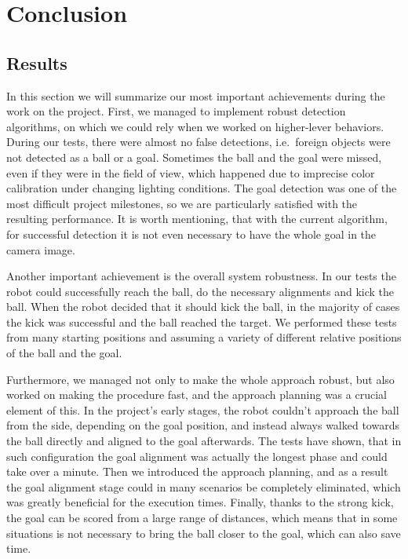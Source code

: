 \chapter{Conclusion}

\section{Results}

In this section we will summarize our most important achievements during the
work on the project. First, we managed to implement robust detection
algorithms, on which we could rely when we worked on higher-lever behaviors.
During our tests, there were almost no false detections, i.e.\ foreign objects
were not detected as a ball or a goal. Sometimes the ball and the goal were
missed, even if they were in the field of view, which happened due to imprecise
color calibration under changing lighting conditions. The goal detection was
one of the most difficult project milestones, so we are particularly satisfied
with the resulting performance. It is worth mentioning, that with the current
algorithm, for successful detection it is not even necessary to have the whole
goal in the camera image.

Another important achievement is the overall system robustness. In our tests
the robot could successfully reach the ball, do the necessary alignments and
kick the ball. When the robot decided that it should kick the ball, in the
majority of cases the kick was successful and the ball reached the target. We
performed these tests from many starting positions and assuming a variety of
different relative positions of the ball and the goal.

Furthermore, we managed not only to make the whole approach robust, but also
worked on making the procedure fast, and the approach planning was a crucial
element of this. In the project's early stages, the robot couldn't approach the
ball from the side, depending on the goal position, and instead always walked
towards the ball directly and aligned to the goal afterwards. The tests have
shown, that in such configuration the goal alignment was actually the longest
phase and could take over a minute. Then we introduced the approach planning,
and as a result the goal alignment stage could in many scenarios be completely
eliminated, which was greatly beneficial for the execution times. Finally,
thanks to the strong kick, the goal can be scored from a large range of
distances, which means that in some situations is not necessary to bring the
ball closer to the goal, which can also save time.


